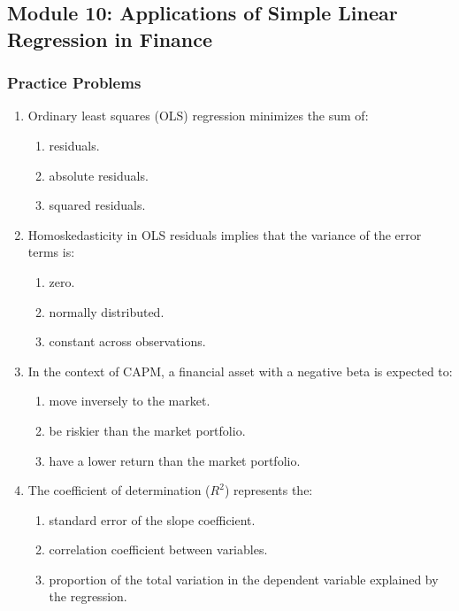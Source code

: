 \newpage

\subsection{Module 10: Applications of Simple Linear Regression in Finance}
\label{sec:app_Problems_M10}

\subsubsection{Practice Problems}
\label{subsec:app_Problems_M10}

\begin{enumerate}
	\item Ordinary least squares (OLS) regression minimizes the sum of:
	      \begin{enumerate}[label=\Alph*.]
		      \item residuals.
		      \item absolute residuals.
		      \item squared residuals.
	      \end{enumerate}

	\item Homoskedasticity in OLS residuals implies that the variance of the error terms is:
	      \begin{enumerate}[label=\Alph*.]
		      \item zero.
		      \item normally distributed.
		      \item constant across observations.
	      \end{enumerate}

	\item In the context of CAPM, a financial asset with a negative beta is expected to:
	      \begin{enumerate}[label=\Alph*.]
		      \item move inversely to the market.
		      \item be riskier than the market portfolio.
		      \item have a lower return than the market portfolio.
	      \end{enumerate}

	\item The coefficient of determination ($R^2$) represents the:
	      \begin{enumerate}[label=\Alph*.]
		      \item standard error of the slope coefficient.
		      \item correlation coefficient between variables.
		      \item proportion of the total variation in the dependent variable explained by the regression.
	      \end{enumerate}


\end{enumerate}
